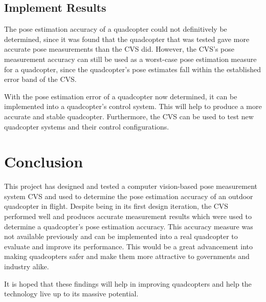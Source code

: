\subsection{Implement Results}

The pose estimation accuracy of a quadcopter could not definitively be determined, since it was found that the quadcopter that was tested gave more accurate pose measurements than the CVS did. However, the CVS's pose measurement accuracy can still be used as a worst-case pose estimation measure for a quadcopter, since the quadcopter's pose estimates fall within the established error band of the CVS.\@ 

With the pose estimation error of a quadcopter now determined, it can be implemented into a quadcopter's control system. This will help to produce a more accurate and stable quadcopter. Furthermore, the CVS can be used to test new quadcopter systems and their control configurations. 

\section{Conclusion}

This project has designed and tested a computer vision-based pose measurement system CVS and used to determine the pose estimation accuracy of an outdoor quadcopter in flight. Despite being in its first design iteration, the CVS performed well and produces accurate measurement results which were used to determine a quadcopter's pose estimation accuracy. This accuracy measure was not available previously and can be implemented into a real quadcopter to evaluate and improve its performance. This would be a great advancement into making quadcopters safer and make them more attractive to governments and industry alike. 


It is hoped that these findings will help in improving quadcopters and help the technology live up to its massive potential. 
